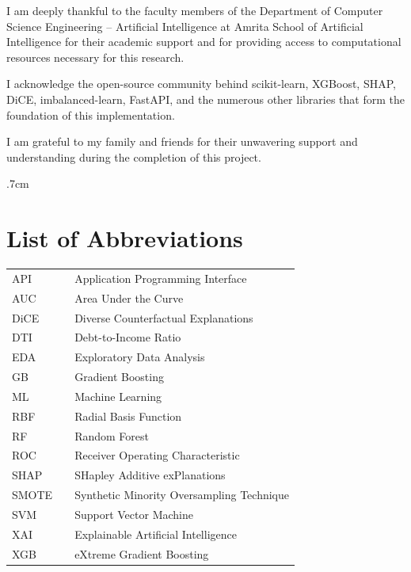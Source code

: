\documentclass[12pt]{report}
\begin{document}
I am deeply thankful to the faculty members of the Department of Computer Science Engineering -- Artificial Intelligence at Amrita School of Artificial Intelligence for their academic support and for providing access to computational resources necessary for this research.

I acknowledge the open-source community behind scikit-learn, XGBoost, SHAP, DiCE, imbalanced-learn, FastAPI, and the numerous other libraries that form the foundation of this implementation.

I am grateful to my family and friends for their unwavering support and understanding during the completion of this project.

\baselineskip .7cm

\cleardoublepage
{}
\listoftables\clearpage

\cleardoublepage


\chapter*{List of Abbreviations\hfill} 
\begin{tabular}{lll}
	API & & Application Programming Interface \\
	AUC & & Area Under the Curve \\
	DiCE & & Diverse Counterfactual Explanations \\
	DTI & & Debt-to-Income Ratio \\
	EDA & & Exploratory Data Analysis \\
	GB & & Gradient Boosting \\
	ML & & Machine Learning \\
	RBF & & Radial Basis Function \\
	RF & & Random Forest \\
	ROC & & Receiver Operating Characteristic \\
	SHAP & & SHapley Additive exPlanations \\
	SMOTE & & Synthetic Minority Oversampling Technique \\
	SVM & & Support Vector Machine \\
	XAI & & Explainable Artificial Intelligence \\
	XGB & & eXtreme Gradient Boosting \\
\end{tabular}
\newpage
\end{document}
